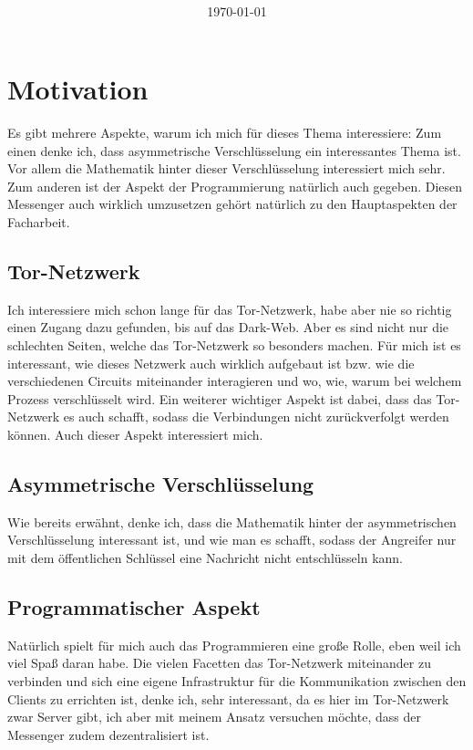 \documentclass[a4paper,10pt,ngerman,
  headheight=28pt,]{scrartcl}
\title{\textbf{\Huge\Titel}}
\subtitle{\textbf{\Huge\SubTitel}}
\author{\LARGE \Author \\\\}
\author{\LARGE \School \\\\}
\date{\LARGE\today}
\begin{document}
\maketitle
\tableofcontents
\setcounter{page}{0}

\vspace{0.5cm}
\pagebreak

\section{Motivation}
Es gibt mehrere Aspekte, warum ich mich für dieses Thema interessiere: Zum einen denke ich, dass asymmetrische Verschlüsselung ein interessantes Thema ist. Vor allem die Mathematik hinter dieser Verschlüsselung interessiert mich sehr. Zum anderen ist der Aspekt der Programmierung natürlich auch gegeben. Diesen Messenger auch wirklich umzusetzen gehört natürlich zu den Hauptaspekten der Facharbeit.

\subsection{Tor-Netzwerk}
Ich interessiere mich schon lange für das Tor-Netzwerk, habe aber nie so richtig einen Zugang dazu gefunden, bis auf das Dark-Web. Aber es sind nicht nur die schlechten Seiten, welche das Tor-Netzwerk so besonders machen. Für mich ist es interessant, wie dieses Netzwerk auch wirklich aufgebaut ist bzw. wie die verschiedenen Circuits miteinander interagieren und wo, wie, warum bei welchem Prozess verschlüsselt wird. Ein weiterer wichtiger Aspekt ist dabei, dass das Tor-Netzwerk es auch schafft, sodass die Verbindungen nicht zurückverfolgt werden können. Auch dieser Aspekt interessiert mich.

\subsection{Asymmetrische Verschlüsselung}
Wie bereits erwähnt, denke ich, dass die Mathematik hinter der asymmetrischen Verschlüsselung interessant ist, und wie man es schafft, sodass der Angreifer nur mit dem öffentlichen Schlüssel eine Nachricht nicht entschlüsseln kann.

\subsection{Programmatischer Aspekt}
Natürlich spielt für mich auch das Programmieren eine große Rolle, eben weil ich viel Spaß daran habe. Die vielen Facetten das Tor-Netzwerk miteinander zu verbinden und sich eine eigene Infrastruktur für die Kommunikation zwischen den Clients zu errichten ist, denke ich, sehr interessant, da es hier im Tor-Netzwerk zwar Server gibt, ich aber mit meinem Ansatz versuchen möchte, dass der Messenger zudem dezentralisiert ist. 
\end{document}
